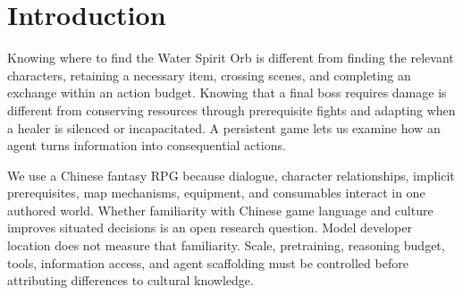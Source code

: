 \documentclass[11pt,a4paper]{article}
\begin{document}
\section{\texorpdfstring{Introduction}{Introduction}}

Knowing where to find the Water Spirit Orb is different from finding the relevant characters, retaining a necessary item, crossing scenes, and completing an exchange within an action budget. Knowing that a final boss requires damage is different from conserving resources through prerequisite fights and adapting when a healer is silenced or incapacitated. A persistent game lets us examine how an agent turns information into consequential actions.

We use a Chinese fantasy RPG because dialogue, character relationships, implicit prerequisites, map mechanisms, equipment, and consumables interact in one authored world. Whether familiarity with Chinese game language and culture improves situated decisions is an open research question. Model developer location does not measure that familiarity. Scale, pretraining, reasoning budget, tools, information access, and agent scaffolding must be controlled before attributing differences to cultural knowledge.
\end{document}
